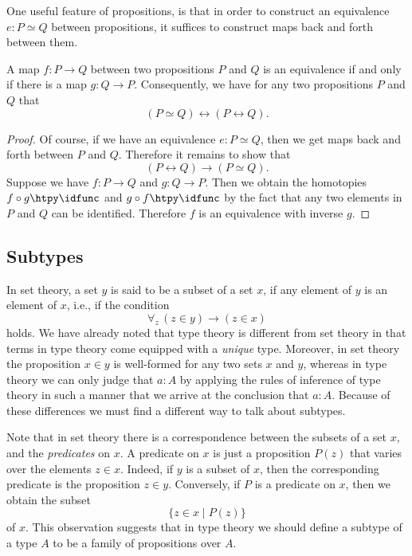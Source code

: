 One useful feature of propositions, is that in order to construct an equivalence $e:P\simeq Q$ between propositions, it suffices to construct maps back and forth between them.

\begin{prp}\label{prp:equiv-prop}
  A map $f:P\to Q$ between two propositions $P$ and $Q$ is an equivalence if and only if there is a map $g:Q\to P$. Consequently, we have for any two propositions $P$ and $Q$ that
  \begin{equation*}
    (P\simeq Q) \leftrightarrow (P\leftrightarrow Q).
  \end{equation*}
\end{prp}

\begin{proof}
  Of course, if we have an equivalence $e:P\simeq Q$, then we get maps back and forth between $P$ and $Q$. Therefore it remains to show that
  \begin{equation*}
    (P\leftrightarrow Q) \to (P\simeq Q).
  \end{equation*}
  Suppose we have $f:P\to Q$ and $g:Q\to P$. Then we obtain the homotopies $f\circ g\htpy \idfunc$ and $g\circ f\htpy \idfunc$ by the fact that any two elements in $P$ and $Q$ can be identified. Therefore $f$ is an equivalence with inverse $g$. 
\end{proof}

\subsection{Subtypes}

  In set theory, a set $y$ is said to be a subset of a set $x$, if any element of $y$ is an element of $x$, i.e., if the condition
  \begin{equation*}
    \forall_z\, (z\in y)\to (z\in x)
  \end{equation*}
  holds. We have already noted that type theory is different from set theory in that terms in type theory come equipped with a \emph{unique} type. Moreover, in set theory the proposition $x\in y$ is well-formed for any two sets $x$ and $y$, whereas in type theory we can only judge that $a:A$ by applying the rules of inference of type theory in such a manner that we arrive at the conclusion that $a:A$. Because of these differences we must find a different way to talk about subtypes.

  Note that in set theory there is a correspondence between the subsets of a set $x$, and the \emph{predicates} on $x$. A predicate on $x$ is just a proposition $P(z)$ that varies over the elements $z\in x$. Indeed, if $y$ is a subset of $x$, then the corresponding predicate is the proposition $z\in y$. Conversely, if $P$ is a predicate on $x$, then we obtain the subset
  \begin{equation*}
    \{z\in x\mid P(z)\}
  \end{equation*}
  of $x$. This observation suggests that in type theory we should define a subtype of a type $A$ to be a family of propositions over $A$.

